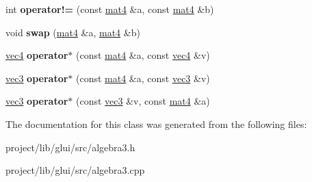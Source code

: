 \begin{DoxyCompactItemize}
\item 
\hypertarget{classmat4_a43bfd79a43b2d40a3afa8f80318325ea}{int {\bfseries operator!=} (const \hyperlink{classmat4}{mat4} \&a, const \hyperlink{classmat4}{mat4} \&b)}\label{classmat4_a43bfd79a43b2d40a3afa8f80318325ea}

\item 
\hypertarget{classmat4_af7bc191797f0f9e2eaf21918bfac24f8}{void {\bfseries swap} (\hyperlink{classmat4}{mat4} \&a, \hyperlink{classmat4}{mat4} \&b)}\label{classmat4_af7bc191797f0f9e2eaf21918bfac24f8}

\item 
\hypertarget{classmat4_a0252c203e5a77099da7fd04c576ed437}{\hyperlink{classvec4}{vec4} {\bfseries operator$\ast$} (const \hyperlink{classmat4}{mat4} \&a, const \hyperlink{classvec4}{vec4} \&v)}\label{classmat4_a0252c203e5a77099da7fd04c576ed437}

\item 
\hypertarget{classmat4_a3a7a7dfc514a58f3c889b48fa4745815}{\hyperlink{classvec3}{vec3} {\bfseries operator$\ast$} (const \hyperlink{classmat4}{mat4} \&a, const \hyperlink{classvec3}{vec3} \&v)}\label{classmat4_a3a7a7dfc514a58f3c889b48fa4745815}

\item 
\hypertarget{classmat4_ac87402f559c51cd778b6012774481c39}{\hyperlink{classvec3}{vec3} {\bfseries operator$\ast$} (const \hyperlink{classvec3}{vec3} \&v, const \hyperlink{classmat4}{mat4} \&a)}\label{classmat4_ac87402f559c51cd778b6012774481c39}

\end{DoxyCompactItemize}


The documentation for this class was generated from the following files\-:\begin{DoxyCompactItemize}
\item 
project/lib/glui/src/algebra3.\-h\item 
project/lib/glui/src/algebra3.\-cpp\end{DoxyCompactItemize}
